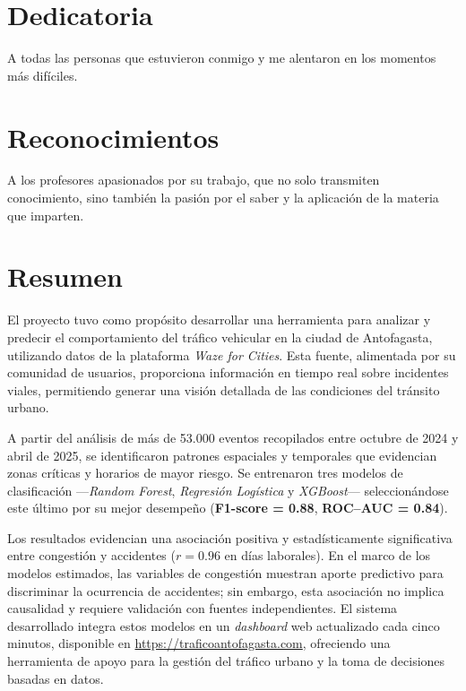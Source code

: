 \documentclass[12pt]{article}
\begin{document}


\section*{Dedicatoria}

A todas las personas que estuvieron conmigo y me alentaron en los momentos más difíciles.

\section*{Reconocimientos}

A los profesores apasionados por su trabajo, que no solo transmiten conocimiento, sino también la pasión por el saber y la aplicación de la materia que imparten.

\newpage
\tableofcontents
\listoffigures
\listoftables
\newpage

\section{Resumen}

\setcounter{page}{1}

El proyecto tuvo como propósito desarrollar una herramienta para analizar y predecir el comportamiento del tráfico vehicular en la ciudad de Antofagasta, utilizando datos de la plataforma \textit{Waze for Cities}. Esta fuente, alimentada por su comunidad de usuarios, proporciona información en tiempo real sobre incidentes viales, permitiendo generar una visión detallada de las condiciones del tránsito urbano.

A partir del análisis de más de 53.000 eventos recopilados entre octubre de 2024 y abril de 2025, se identificaron patrones espaciales y temporales que evidencian zonas críticas y horarios de mayor riesgo. Se entrenaron tres modelos de clasificación —\textit{Random Forest}, \textit{Regresión Logística} y \textit{XGBoost}— seleccionándose este último por su mejor desempeño (\textbf{F1-score = 0.88}, \textbf{ROC–AUC = 0.84}).

Los resultados evidencian una asociación positiva y estadísticamente significativa entre congestión y accidentes ($r = 0.96$ en días laborales). En el marco de los modelos estimados, las variables de congestión muestran aporte predictivo para discriminar la ocurrencia de accidentes; sin embargo, esta asociación no implica causalidad y requiere validación con fuentes independientes. El sistema desarrollado integra estos modelos en un \textit{dashboard} web actualizado cada cinco minutos, disponible en \url{https://traficoantofagasta.com}, ofreciendo una herramienta de apoyo para la gestión del tráfico urbano y la toma de decisiones basadas en datos.
\end{document}
